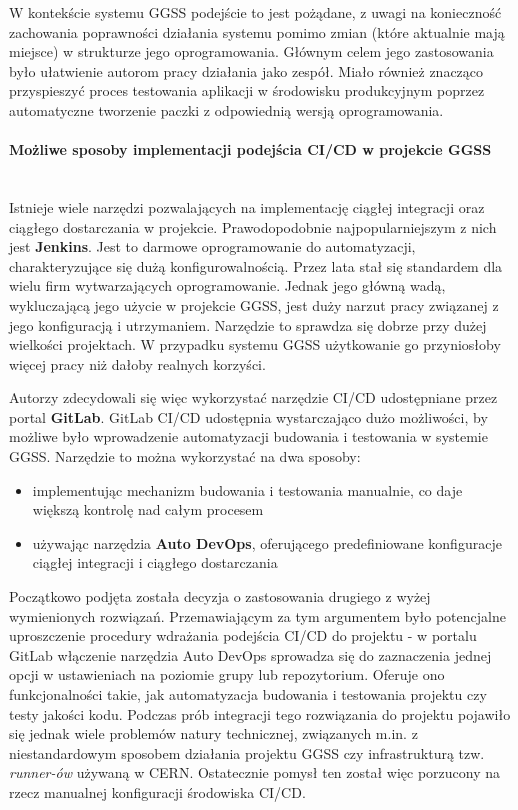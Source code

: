 W kontekście systemu GGSS podejście to jest pożądane, z uwagi na konieczność zachowania poprawności działania systemu pomimo zmian (które aktualnie mają miejsce) w strukturze jego oprogramowania. Głównym celem jego zastosowania było ułatwienie autorom pracy działania jako zespół. Miało również znacząco przyspieszyć proces testowania aplikacji w środowisku produkcyjnym poprzez automatyczne tworzenie paczki z odpowiednią wersją oprogramowania.

\paragraph*{Możliwe sposoby implementacji podejścia CI/CD w projekcie GGSS}\mbox{}\\
Istnieje wiele narzędzi pozwalających na implementację ciągłej integracji oraz ciągłego dostarczania w projekcie. Prawodopodobnie najpopularniejszym z nich jest \textbf{Jenkins}. Jest to darmowe oprogramowanie do automatyzacji, charakteryzujące się dużą konfigurowalnością. Przez lata stał się standardem dla wielu firm wytwarzających oprogramowanie. Jednak jego główną wadą, wykluczającą jego użycie w projekcie GGSS, jest duży narzut pracy związanej z jego konfiguracją i utrzymaniem. Narzędzie to sprawdza się dobrze przy dużej wielkości projektach. W przypadku systemu GGSS użytkowanie go przyniosłoby więcej pracy niż dałoby realnych korzyści. 

Autorzy zdecydowali się więc wykorzystać narzędzie CI/CD udostępniane przez portal \textbf{GitLab}. GitLab CI/CD udostępnia wystarczająco dużo możliwości, by możliwe było wprowadzenie automatyzacji budowania i testowania w systemie GGSS. Narzędzie to można wykorzystać na dwa sposoby:
\begin{itemize}
\item implementując mechanizm budowania i testowania manualnie, co daje większą kontrolę nad całym procesem
\item używając narzędzia \textbf{Auto DevOps}, oferującego predefiniowane konfiguracje ciągłej integracji i ciągłego dostarczania
\end{itemize}
Początkowo podjęta została decyzja o zastosowania drugiego z wyżej wymienionych rozwiązań. Przemawiającym za tym argumentem było potencjalne uproszczenie procedury wdrażania podejścia CI/CD do projektu - w portalu GitLab włączenie narzędzia Auto DevOps sprowadza się do zaznaczenia jednej opcji w ustawieniach na poziomie grupy lub repozytorium. Oferuje ono funkcjonalności takie, jak automatyzacja budowania i testowania projektu czy testy jakości kodu. Podczas prób integracji tego rozwiązania do projektu pojawiło się jednak wiele problemów natury technicznej, związanych m.in. z niestandardowym sposobem działania projektu GGSS czy infrastrukturą tzw. \textit{runner-ów} używaną w CERN. Ostatecznie pomysł ten został więc porzucony na rzecz manualnej konfiguracji środowiska CI/CD. 

